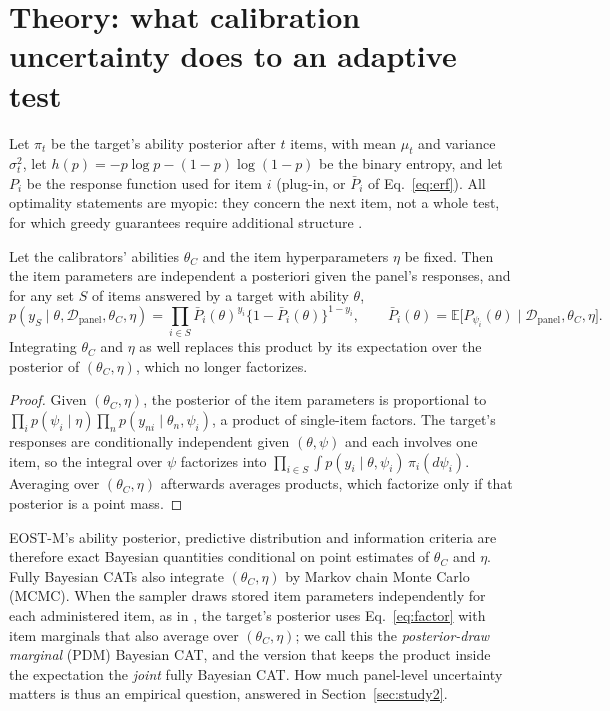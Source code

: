 \section{Theory: what calibration uncertainty does to an adaptive test}
\label{sec:theory}

Let $\pi_t$ be the target's ability posterior after $t$ items, with mean $\mu_t$ and
variance $\sigma_t^2$, let $h(p)=-p\log p-(1-p)\log(1-p)$ be the binary entropy, and let
$P_i$ be the response function used for item $i$ (plug-in, or $\bar P_i$ of
Eq.~\eqref{eq:erf}). All optimality statements are myopic: they concern the next item, not a
whole test, for which greedy guarantees require additional structure
\citep{golovin2011adaptive}.

\begin{lemma}\label{lem:exact}
Let the calibrators' abilities $\theta_C$ and the item hyperparameters $\eta$ be fixed. Then
the item parameters are independent a posteriori given the panel's responses, and for any set
$S$ of items answered by a target with ability $\theta$,
\begin{equation}\label{eq:factor}
p(y_S\mid\theta,\mathcal D_{\mathrm{panel}},\theta_C,\eta)=\prod_{i\in S}\bar P_i(\theta)^{y_i}\{1-\bar P_i(\theta)\}^{1-y_i},
\qquad \bar P_i(\theta)=\mathbb E\big[P_{\psi_i}(\theta)\mid\mathcal D_{\mathrm{panel}},\theta_C,\eta\big].
\end{equation}
Integrating $\theta_C$ and $\eta$ as well replaces this product by its expectation over the
posterior of $(\theta_C,\eta)$, which no longer factorizes.
\end{lemma}

\begin{proof}
Given $(\theta_C,\eta)$, the posterior of the item parameters is proportional to
$\prod_i p(\psi_i\mid\eta)\prod_n p(y_{ni}\mid\theta_n,\psi_i)$, a product of single-item
factors. The target's responses are conditionally independent given $(\theta,\psi)$ and
each involves one item, so the integral over $\psi$ factorizes into
$\prod_{i\in S}\int p(y_i\mid\theta,\psi_i)\,\pi_i(d\psi_i)$. Averaging over
$(\theta_C,\eta)$ afterwards averages products, which factorize only if that posterior is a
point mass.
\end{proof}

EOST-M's ability posterior, predictive distribution and information criteria are therefore
exact Bayesian quantities conditional on point estimates of $\theta_C$ and $\eta$. Fully
Bayesian CATs \citep{vanderlinden2020fast,fink2025accounting} also integrate
$(\theta_C,\eta)$ by Markov chain Monte Carlo (MCMC). When the sampler draws stored item
parameters independently for each administered item, as in \citet{vanderlinden2020fast},
the target's posterior uses Eq.~\eqref{eq:factor} with item marginals that also average
over $(\theta_C,\eta)$; we call this the \emph{posterior-draw marginal} (PDM) Bayesian CAT,
and the version that keeps the product inside the expectation the \emph{joint} fully
Bayesian CAT. How much panel-level uncertainty matters is thus an empirical question,
answered in Section~\ref{sec:study2}.

